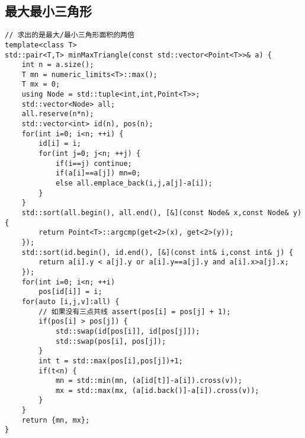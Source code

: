 \subsection{最大最小三角形}
\begin{lstlisting}
// 求出的是最大/最小三角形面积的两倍
template<class T>
std::pair<T,T> minMaxTriangle(const std::vector<Point<T>>& a) {
    int n = a.size();
    T mn = numeric_limits<T>::max();
    T mx = 0;
    using Node = std::tuple<int,int,Point<T>>;
    std::vector<Node> all;
    all.reserve(n*n);
    std::vector<int> id(n), pos(n);
    for(int i=0; i<n; ++i) {
        id[i] = i;
        for(int j=0; j<n; ++j) {
            if(i==j) continue;
            if(a[i]==a[j]) mn=0;
            else all.emplace_back(i,j,a[j]-a[i]);
        }
    }
    std::sort(all.begin(), all.end(), [&](const Node& x,const Node& y) {
        return Point<T>::argcmp(get<2>(x), get<2>(y));
    });
    std::sort(id.begin(), id.end(), [&](const int& i,const int& j) {
        return a[i].y < a[j].y or a[i].y==a[j].y and a[i].x>a[j].x;
    });
    for(int i=0; i<n; ++i)
        pos[id[i]] = i;
    for(auto [i,j,v]:all) {
        // 如果没有三点共线 assert(pos[i] = pos[j] + 1);
        if(pos[i] > pos[j]) {
            std::swap(id[pos[i]], id[pos[j]]);
            std::swap(pos[i], pos[j]);
        }
        int t = std::max(pos[i],pos[j])+1;
        if(t<n) {
            mn = std::min(mn, (a[id[t]]-a[i]).cross(v));
            mx = std::max(mx, (a[id.back()]-a[i]).cross(v));
        }
    }
    return {mn, mx};
}
\end{lstlisting}

